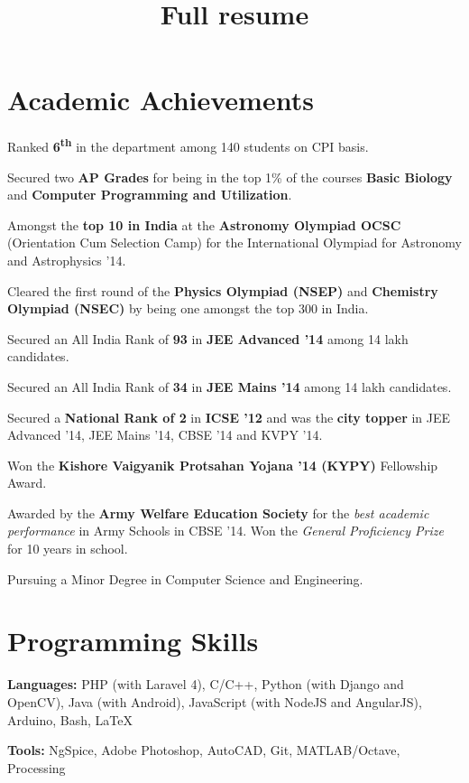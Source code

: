 \documentclass[11pt]{resume}
\title{Full resume}
\begin{document}
\vspace*{20mm}
\vspace{-2em}
\begin{resume}
\section{\mysidestyle Academic Achievements}
\begin{list2}
\item Ranked \textbf {6\textsuperscript{th}} in the department among 140 students on CPI basis.
\item Secured two \textbf {AP Grades} for being in the top 1\% of the courses \textbf{Basic Biology} and \textbf{Computer Programming and Utilization}.
\item Amongst the \textbf{top 10 in India} at the \textbf {Astronomy Olympiad OCSC} (Orientation Cum Selection Camp) for the International Olympiad for Astronomy and Astrophysics '14.
\item Cleared the first round of the \textbf{Physics Olympiad (NSEP)} and \textbf{Chemistry Olympiad (NSEC)} by being one amongst the top 300 in India.
\item Secured an All India Rank of \textbf{93} in \textbf{JEE Advanced '14} among 14 lakh candidates.
\item Secured an All India Rank of \textbf{34} in \textbf{JEE Mains '14} among 14 lakh candidates.
\item Secured a \textbf{National Rank of 2} in \textbf{ICSE '12} and was the \textbf{city topper} in  JEE Advanced '14, JEE Mains '14, CBSE '14 and KVPY '14.
\item Won the \textbf {Kishore Vaigyanik Protsahan Yojana '14 (KYPY)} Fellowship Award.
\item Awarded by the \textbf {Army Welfare Education Society} for the \textit{best academic performance} in Army Schools in CBSE '14. Won the \textit{General Proficiency Prize} for 10 years in school.
\item Pursuing a Minor Degree in Computer Science and Engineering. 
\end{list2}

\section{\mysidestyle Programming Skills}
\begin{list2}
\item \textbf{Languages:} PHP (with Laravel 4), C/C++, Python (with Django and OpenCV), Java (with Android), JavaScript (with NodeJS and AngularJS), Arduino, Bash, \LaTeX
\item \textbf{Tools:} NgSpice, Adobe Photoshop, AutoCAD, Git, MATLAB/Octave, Processing
\end{list2}

\end{resume}
\end{document}
